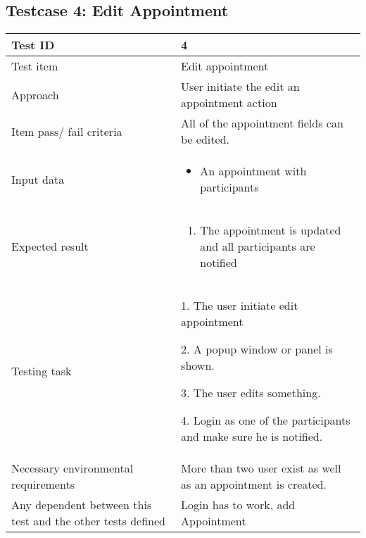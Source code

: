 \documentclass[a4paper, 10pt]{article}
\begin{document}
\subsection{Testcase 4: Edit Appointment}

\begin{tabularx}{\textwidth}{ |X|X| }
\hline
\rowcolor{Gray}
Test ID & 4 \\ \hline
Test item & Edit appointment \\ \hline
Approach & User initiate the edit an appointment action \\ \hline
Item pass/ fail criteria & All of the appointment fields can be edited.\\ \hline
Input data & 
\begin{itemize}
	\item An appointment with participants
\end{itemize}\\ \hline
Expected result & 
\begin{enumerate}
	\item The appointment is updated and all participants are notified
\end{enumerate} \\ \hline
Testing task &
\begin{task steps}
	\item 1. The user initiate edit appointment
	\item 2. A popup window or panel is shown. 
	\item 3. The user edits something.
	\item 4. Login as one of the participants and make sure he is notified. 
\end{task steps}	\\ \hline
Necessary environmental requirements & More than two user exist as well as an appointment is created.   \\ \hline
Any dependent between this test and the other tests defined & Login has to work, add Appointment  \\ \hline

\end{tabularx}
\end{document}
